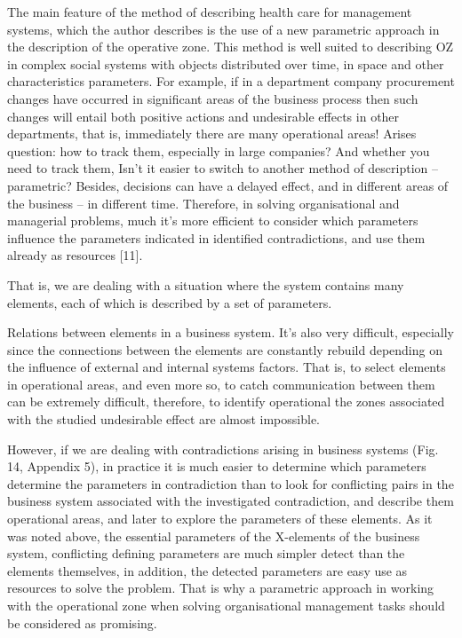 \documentclass[11pt,a4paper]{book}
\begin{document}
The main feature of the method of describing health care for management
systems, which the author describes is the use of a new parametric approach in
the description of the operative zone. This method is well suited to
describing OZ in complex social systems with objects distributed over time, in
space and other characteristics parameters. For example, if in a department
company procurement changes have occurred in significant areas of the business
process then such changes will entail both positive actions and undesirable
effects in other departments, that is, immediately there are many operational
areas! Arises question: how to track them, especially in large companies? And
whether you need to track them, Isn’t it easier to switch to another method of
description -- parametric? Besides, decisions can have a delayed effect, and
in different areas of the business -- in different time. Therefore, in solving
organisational and managerial problems, much it’s more efficient to consider
which parameters influence the parameters indicated in identified
contradictions, and use them already as resources [11].

That is, we are dealing with a situation where the system contains many
elements, each of which is described by a set of parameters.

Relations between elements in a business system.  It’s also very difficult,
especially since the connections between the elements are constantly rebuild
depending on the influence of external and internal systems factors. That is,
to select elements in operational areas, and even more so, to catch
communication between them can be extremely difficult, therefore, to identify
operational the zones associated with the studied undesirable effect are
almost impossible.

However, if we are dealing with contradictions arising in business systems
(Fig. 14, Appendix 5), in practice it is much easier to determine which
parameters determine the parameters in contradiction than to look for
conflicting pairs in the business system associated with the investigated
contradiction, and describe them operational areas, and later to explore the
parameters of these elements. As it was noted above, the essential parameters
of the X-elements of the business system, conflicting defining parameters are
much simpler detect than the elements themselves, in addition, the detected
parameters are easy use as resources to solve the problem. That is why a
parametric approach in working with the operational zone when solving
organisational management tasks should be considered as promising.
\end{document}
